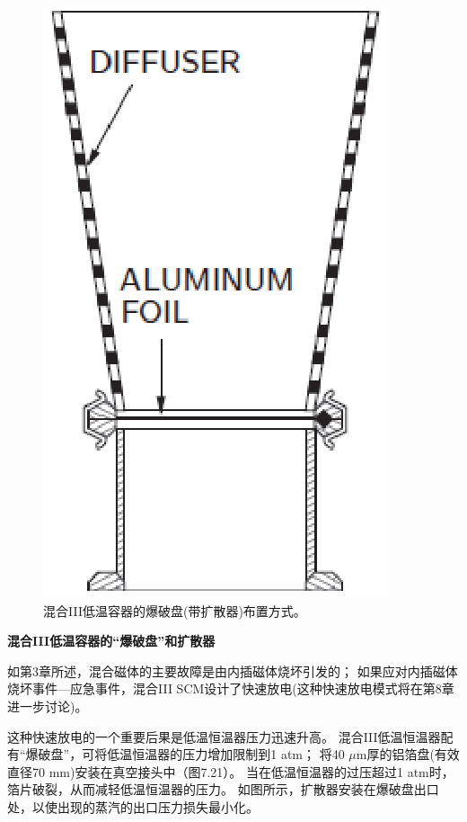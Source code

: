 \begin{figure}[htbp]
	\centering
	\includegraphics[scale=0.7]{chpt7/figs/fig7.21.eps}
	\caption{混合III低温容器的爆破盘(带扩散器)布置方式。}
\end{figure}

\textbf{混合III低温容器的“爆破盘”和扩散器}

如第3章所述，混合磁体的主要故障是由内插磁体烧坏引发的；
如果应对内插磁体烧坏事件---应急事件，混合III SCM设计了快速放电(这种快速放电模式将在第8章进一步讨论)。

这种快速放电的一个重要后果是低温恒温器压力迅速升高。
混合III低温恒温器配有“爆破盘”，可将低温恒温器的压力增加限制到1 atm；
将40 $\mu$m厚的铝箔盘(有效直径70 mm)安装在真空接头中（图7.21）。
当在低温恒温器的过压超过1 atm时，箔片破裂，从而减轻低温恒温器的压力。
如图所示，扩散器安装在爆破盘出口处，以使出现的蒸汽的出口压力损失最小化。

